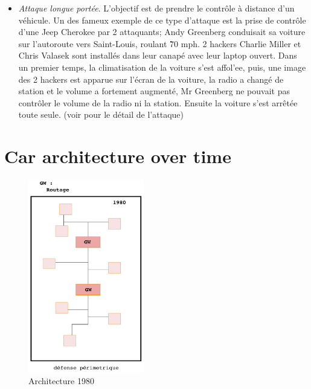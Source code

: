 \begin{itemize}
\item \emph{Attaque longue port\'ee}. L'objectif est de prendre le contr\^ole \`a distance d'un v\'ehicule. Un des fameux exemple de ce type d'attaque est la prise de contr\^ole d'une Jeep Cherokee par 2 attaquants; Andy Greenberg conduisait sa voiture sur l'autoroute vers Saint-Louis, roulant \` 70 mph. 2 hackers Charlie Miller et Chris Valasek sont install\'es dans leur canap\'e avec leur laptop ouvert. Dans un premier temps, la climatisation de la voiture s'est affol'ee, puis, une image des 2 hackers est apparue sur l'\'ecran de la voiture, la radio a chang\'e de station et le volume a fortement augment\'e, Mr Greenberg ne pouvait pas contr\^oler le volume de la radio ni la station. Ensuite la voiture s'est arr\^et\'ee toute seule. (voir \cite{Mil2015} pour le d\'etail de l'attaque)
\end{itemize}



\section {Car architecture over time }

\begin{figure}[h]
    \centering
	\includegraphics[width=0.45\textwidth]{schema/architecture/1980.pdf}
    \caption{Architecture 1980}
    \label{1980_archi}
\end{figure}

